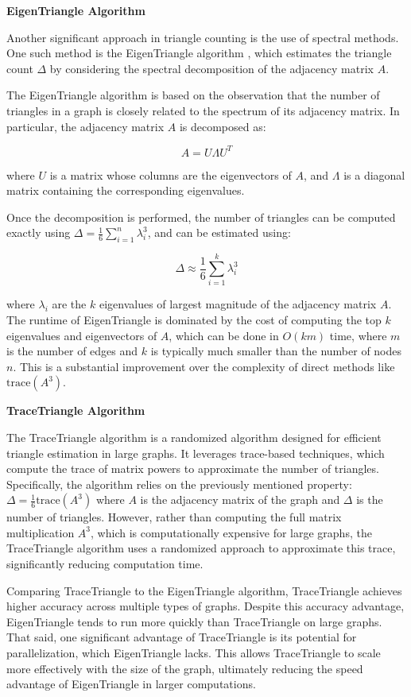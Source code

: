 \documentclass[12pt]{article}
\newcommand{\subsubsubsection}[1]{
  \vspace{1em} %
  \noindent\textbf{#1} %
  \vspace{0.5em} %
}
\begin{document}
\subsubsubsection{EigenTriangle Algorithm}

Another significant approach in triangle counting is the use of spectral methods.
One such method is the EigenTriangle algorithm \cite{tsourakakis_fast_2008}, which estimates the triangle count $\Delta$ by considering the spectral decomposition of the adjacency matrix $A$.

The EigenTriangle algorithm is based on the observation that the number of triangles in a graph is closely related to the spectrum of its adjacency matrix.
In particular, the adjacency matrix $A$ is decomposed as:

\[
A = U \Lambda U^T
\]

where $U$ is a matrix whose columns are the eigenvectors of $A$, and $\Lambda$ is a diagonal matrix containing the corresponding eigenvalues.

Once the decomposition is performed, the number of triangles can be computed exactly using $\Delta = \frac{1}{6} \sum_{i=1}^{n} \lambda_i^3$, and can be estimated using:

\[
\Delta \approx \frac{1}{6} \sum_{i=1}^{k} \lambda_i^3
\]

where $\lambda_i$ are the $k$ eigenvalues of largest magnitude of the adjacency matrix $A$.
The runtime of EigenTriangle is dominated by the cost of computing the top $k$ eigenvalues and eigenvectors of $A$, which can be done in $O(k m)$ time, where $m$ is the number of edges and $k$ is typically much smaller than the number of nodes $n$.
This is a substantial improvement over the complexity of direct methods like $\mathrm{trace}(A^3)$.

\subsubsubsection{TraceTriangle Algorithm}

The TraceTriangle algorithm \cite{avron_counting_2010} is a randomized algorithm designed for efficient triangle estimation in large graphs.
It leverages trace-based techniques, which compute the trace of matrix powers to approximate the number of triangles.
Specifically, the algorithm relies on the previously mentioned property: $\Delta = \frac{1}{6} \mathrm{trace}(A^3)$ where $A$ is the adjacency matrix of the graph and $\Delta$ is the number of triangles.
However, rather than computing the full matrix multiplication $A^3$, which is computationally expensive for large graphs, the TraceTriangle algorithm uses a randomized approach to approximate this trace, significantly reducing computation time.

Comparing TraceTriangle to the EigenTriangle algorithm, TraceTriangle achieves higher accuracy across multiple types of graphs.
Despite this accuracy advantage, EigenTriangle tends to run more quickly than TraceTriangle on large graphs.
That said, one significant advantage of TraceTriangle is its potential for parallelization, which EigenTriangle lacks.
This allows TraceTriangle to scale more effectively with the size of the graph, ultimately reducing the speed advantage of EigenTriangle in larger computations.
\end{document}
